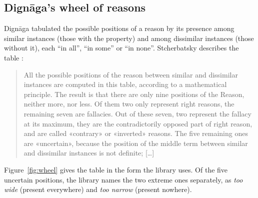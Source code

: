 \documentclass[11pt]{article}
\theoremstyle{plain}
\theoremstyle{definition}
\begin{document}
\subsection{Dignāga's wheel of reasons}

Dignāga tabulated the possible positions of a reason by its presence among similar
instances (those with the property) and among dissimilar instances (those without it), each
``in all'', ``in some'' or ``in none''. Stcherbatsky describes the table
\cite[p.~321]{Stcherbatsky1932}:

\begin{quote}
All the possible positions of the reason between similar and dissimilar instances are
computed in this table, according to a mathematical principle. The result is that there are
only nine positions of the Reason, neither more, nor less. Of them two only represent right
reasons, the remaining seven are fallacies. Out of these seven, two represent the fallacy at
its maximum, they are the contradictorily opposed part of right reason, and are called
«contrary» or «inverted» reasons. The five remaining ones are «uncertain», because the
position of the middle term between similar and dissimilar instances is not definite;
[\ldots]
\end{quote}

\noindent Figure~\ref{fig:wheel} gives the table in the form the library uses. Of the five
uncertain positions, the library names the two extreme ones separately, as \emph{too wide}
(present everywhere) and \emph{too narrow} (present nowhere).
\end{document}
